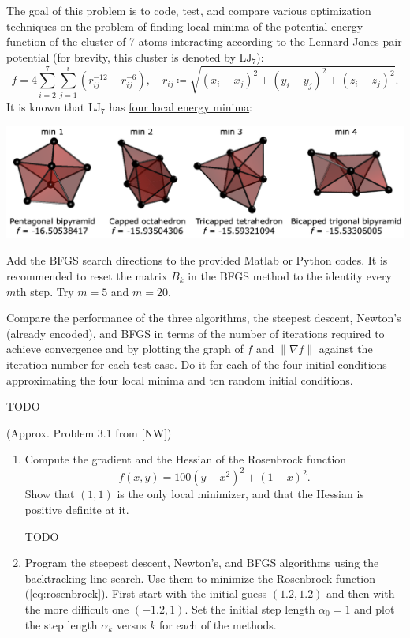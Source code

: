 \documentclass{../kin_math}
\begin{document}
\begin{questions}
  \question The goal of this problem is to code, test, and compare various optimization techniques on the problem of finding local minima of the potential energy function of the cluster of 7 atoms interacting according to the Lennard-Jones pair potential (for brevity, this cluster is denoted by $\text{LJ}_7$):
  \begin{equation}
    f = 4 \sum_{i = 2}^7 \sum_{j = 1}^i \left(r_{ij}^{-12} - r_{ij}^{-6}\right), \quad r_{ij} \coloneqq \sqrt{(x_i - x_j)^2 + (y_i - y_j)^2 + (z_i - z_j)^2}.
  \end{equation}
  \newpage
  It is known that $\text{LJ}_7$ has \href{https://doi.org/10.1063/1.475008}{four local energy minima}:
  \begin{center}
    \includegraphics[scale=0.2]{minima.png}
  \end{center}
  Add the BFGS search directions to the provided Matlab or Python codes. It is recommended to reset the matrix $B_k$ in the BFGS method to the identity every $m$th step. Try $m = 5$ and $m = 20$.

  Compare the performance of the three algorithms, the steepest descent, Newton's (already encoded), and BFGS in terms of the number of iterations required to achieve convergence and by plotting the graph of $f$ and $\lVert \nabla f \rVert$ against the iteration number for each test case. Do it for each of the four initial conditions approximating the four local minima and ten random initial conditions.
  \begin{solution}
    TODO
  \end{solution}

  \question (Approx. Problem 3.1 from [NW])
  \begin{enumerate}
    \item Compute the gradient and the Hessian of the Rosenbrock function
    \begin{equation}
      \label{eq:rosenbrock}
      f(x, y) = 100(y - x^2)^2 + (1 - x)^2.
    \end{equation}
    Show that $(1, 1)$ is the only local minimizer, and that the Hessian is positive definite at it.
    \begin{solution}
      TODO
    \end{solution}
    \item Program the steepest descent, Newton's, and BFGS algorithms using the backtracking line search. Use them to minimize the Rosenbrock function (\ref{eq:rosenbrock}). First start with the initial guess $(1.2, 1.2)$ and then with the more difficult one $(-1.2, 1)$. Set the initial step length $\alpha_0 = 1$ and plot the step length $\alpha_k$ versus $k$ for each of the methods.


\end{enumerate}
\end{questions}
\end{document}

